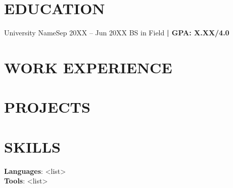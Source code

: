 
\section{EDUCATION}
  \resumeSubHeadingListStart
    \resumeEducation
      {University Name}{Sep 20XX -- Jun 20XX}
      {BS in Field\textbf{ | GPA: X.XX/4.0}}
  \resumeSubHeadingListEnd

\section{WORK EXPERIENCE}
  \resumeSubHeadingListStart
    

\ifResumeIncludeEarlyRoles
    
\fi
  \resumeSubHeadingListEnd
\resumeSectionGap

\section{PROJECTS}
    \resumeSubHeadingListStart
      
    \resumeSubHeadingListEnd
\resumeSectionGap

\section{SKILLS}
\begin{itemize}[leftmargin=0.15in, label={}, topsep=0pt, partopsep=0pt]
  \small{
    \item{
      \textbf{Languages}{: <list>} \\
      \textbf{Tools}{: <list>}
    }
  }
\end{itemize}
\resumeSectionGap
